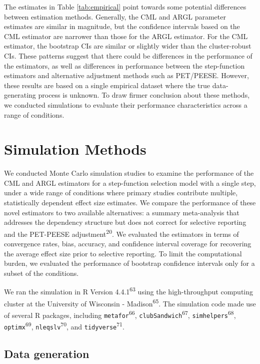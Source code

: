 \documentclass[
  american,
  man, donotrepeattitle,floatsintext]{apa7}
\begin{document}
The estimates in Table \ref{tab:empirical} point towards some potential differences between estimation methods.
Generally, the CML and ARGL parameter estimates are similar in magnitude, but the confidence intervals based on the CML estimator are narrower than those for the ARGL estimator.
For the CML estimator, the bootstrap CIs are similar or slightly wider than the cluster-robust CIs.
These patterns suggest that there could be differences in the performance of the estimators, as well as differences in performance between the step-function estimators and alternative adjustment methods such as PET/PEESE.
However, these results are based on a single empirical dataset where the true data-generating process is unknown.
To draw firmer conclusion about these methods, we conducted simulations to evaluate their performance characteristics across a range of conditions.

\section{Simulation Methods}\label{simulation-methods}

We conducted Monte Carlo simulation studies to examine the performance
of the CML and ARGL estimators for a step-function selection model with a single step, under a wide range of conditions where primary studies contribute multiple, statistically dependent effect size estimates.
We compare the performance of these novel estimators to two available alternatives: a summary meta-analysis that addresses the dependency structure but does not correct for selective reporting and the PET-PEESE adjustment\textsuperscript{20}.
We evaluated the estimators in terms of convergence rates, bias, accuracy, and confidence interval coverage for recovering the average effect size prior to selective reporting.
To limit the computational burden, we evaluated the performance of bootstrap confidence intervals only for a subset of the conditions.

We ran the simulation in R Version 4.4.1\textsuperscript{63} using the high-throughput computing cluster at the University of Wisconsin - Madison\textsuperscript{65}.
The simulation code made use of several R packages, including \texttt{metafor}\textsuperscript{66}, \texttt{clubSandwich}\textsuperscript{67}, \texttt{simhelpers}\textsuperscript{68}, \texttt{optimx}\textsuperscript{69}, \texttt{nleqslv}\textsuperscript{70}, and \texttt{tidyverse}\textsuperscript{71}.

\subsection{Data generation}\label{data-generation}
\end{document}
